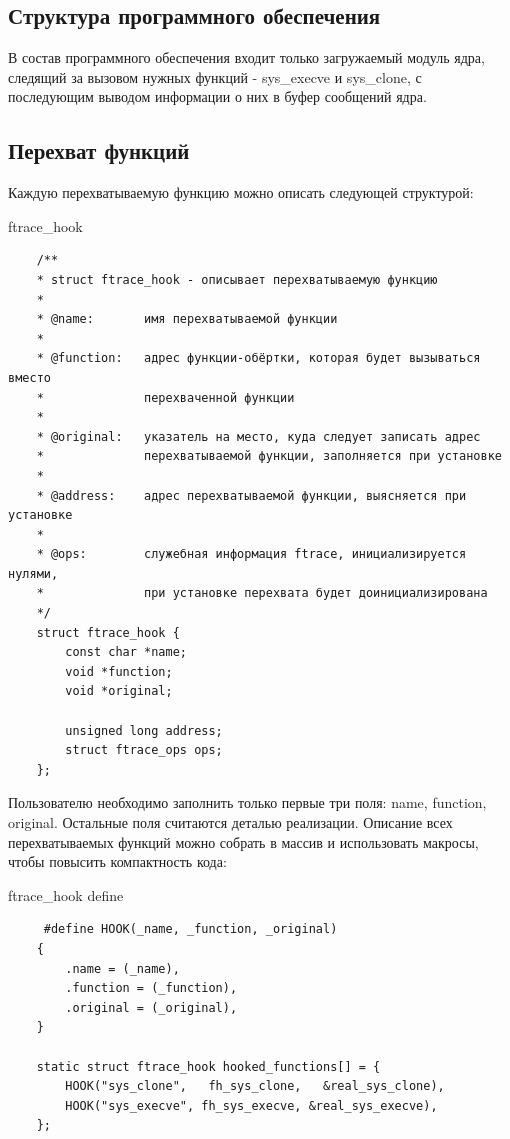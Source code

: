 \documentclass[a4paper,14pt]{extarticle}
\begin{document}
 \subsection{Структура программного обеспечения}
 
 В состав программного обеспечения входит только загружаемый модуль яд­ра, следящий за вызовом нужных функций - sys\_execve и sys\_clone, с последующим выводом информации о них в буфер сообщений ядра.
 
 \subsection{Перехват функций}
 
 Каждую перехватываемую функцию можно описать следующей структурой:
 
 \begin{listing}[h]
 	\caption{ftrace\_hook}
 	\begin{verbatim}
 	/**
 	* struct ftrace_hook - описывает перехватываемую функцию
 	*
 	* @name:       имя перехватываемой функции
 	*
 	* @function:   адрес функции-обёртки, которая будет вызываться вместо
 	*              перехваченной функции
 	*
 	* @original:   указатель на место, куда следует записать адрес
 	*              перехватываемой функции, заполняется при установке
 	*
 	* @address:    адрес перехватываемой функции, выясняется при установке
 	*
 	* @ops:        служебная информация ftrace, инициализируется нулями,
 	*              при установке перехвата будет доинициализирована
 	*/
 	struct ftrace_hook {
	 	const char *name;
	 	void *function;
	 	void *original;
	 	
	 	unsigned long address;
	 	struct ftrace_ops ops;
 	};
 	\end{verbatim}
 \end{listing}
 
 Пользователю необходимо заполнить только первые три поля: name, function, original. Остальные поля считаются деталью реализации. Описание всех перехватываемых функций можно собрать в массив и использовать макросы, чтобы повысить компактность кода:
 
 \begin{listing}[h]
 	\caption{ftrace\_hook define}
 	\begin{verbatim}
 	 #define HOOK(_name, _function, _original)       
 	{                                       
	 	.name = (_name),                    
	 	.function = (_function),            
	 	.original = (_original),            
 	}
 	
 	static struct ftrace_hook hooked_functions[] = {
	 	HOOK("sys_clone",   fh_sys_clone,   &real_sys_clone),
	 	HOOK("sys_execve", fh_sys_execve, &real_sys_execve),
 	};
 	\end{verbatim}
\end{listing}
 
\end{document}
